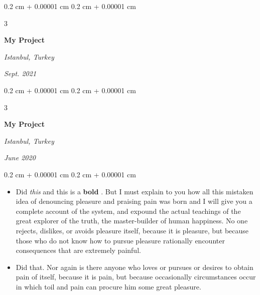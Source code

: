 \documentclass[10pt, letterpaper]{article}
\newenvironment{highlights}{
    \begin{itemize}[
        topsep=0.10 cm,
        parsep=0.10 cm,
        partopsep=0pt,
        itemsep=0pt,
        leftmargin=0.4 cm + 10pt + 0.6 cm
    ]
}{
    \end{itemize}
} %
\newenvironment{onecolentry}{
    \begin{adjustwidth}{
        0.2 cm + 0.00001 cm
    }{
        0.2 cm + 0.00001 cm
    }
}{
    \end{adjustwidth}
} %
\newenvironment{threecolentry}[3][]{
    \onecolentry
    \def\thirdColumn{#3}
    \setcolumnwidth{0.6 cm, \fill, 4.5 cm}
    \begin{paracol}{3}
    #2 \switchcolumn
}{
    \switchcolumn \raggedleft \thirdColumn
    \end{paracol}
    \endonecolentry
} %
\let\hrefWithoutArrow\href
\renewcommand{\href}[2]{\hrefWithoutArrow{#1}{\mbox{\ifthenelse{\equal{#2}{}}{ }{#2 }\raisebox{.15ex}{\footnotesize \faExternalLink*}}}}
\begin{document}
        \vspace{0.2 cm-3px}

        \begin{threecolentry}{
            \vspace*{\fill}
            \textbullet
            \vspace*{3px}
            \vspace*{\fill}
        }{
        \textit{Istanbul, Turkey}    
            
        \textit{Sept. 2021}}
            \textbf{My Project}
        \end{threecolentry}



        \vspace{0.2 cm-3px}

        \begin{threecolentry}{
            \vspace*{\fill}
            \textbullet
            \vspace*{3px}
            \vspace*{\fill}
        }{
        \textit{Istanbul, Turkey}    
            
        \textit{June 2020}}
            \textbf{My Project}
        \end{threecolentry}

        \vspace{0.10 cm-3px}
        \begin{onecolentry}
            \begin{highlights}
                \item Did \textit{this} and this is a \textbf{bold} \href{https://example.com}{link}. But I must explain to you how all this mistaken idea of denouncing pleasure and praising pain was born and I will give you a complete account of the system, and expound the actual teachings of the great explorer of the truth, the master-builder of human happiness. No one rejects, dislikes, or avoids pleasure itself, because it is pleasure, but because those who do not know how to pursue pleasure rationally encounter consequences that are extremely painful.
                \item Did that. Nor again is there anyone who loves or pursues or desires to obtain pain of itself, because it is pain, but because occasionally circumstances occur in which toil and pain can procure him some great pleasure.
            \end{highlights}
        \end{onecolentry}
\end{document}
